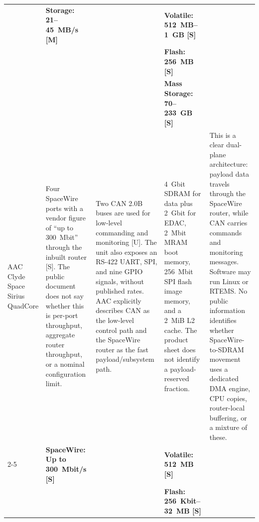 \documentclass[10pt]{../datasheet}
\let\cite\citep
\begin{document}
\begin{landscape}
\begin{longtable}{|p{3.2cm}|p{4.5cm}|p{4.5cm}|p{4.5cm}|p{5.5cm}|}
                                                                       & \textbf{Storage: 21--45~MB/s [M]}
                                                                       &
                                                                       & \textbf{Volatile: 512~MB--1~GB [S]}                                        &                                                                                                \\
                                                                       &                                                                            &                                                  & \textbf{Flash: 256~MB [S]}                & \\
                                                                       &                                                                            &                                                  & \textbf{Mass Storage: 70--233~GB [S]}     & \\ \hline\hline

    AAC Clyde Space Sirius QuadCore \cite{aac_sirius_quadcore_ds}      &
    Four SpaceWire ports with a vendor figure of ``up to 300~Mbit'' through the
    inbuilt router [S]. The public document does not say whether this is
    per-port throughput, aggregate router throughput, or a nominal configuration
    limit.                                                             &
    Two CAN 2.0B buses are used for low-level commanding and monitoring [U]. The
    unit also exposes an RS-422 UART, SPI, and nine GPIO signals, without
    published rates. AAC explicitly describes CAN as the low-level control path
    and the SpaceWire router as the fast payload/subsystem path.       & 4~Gbit SDRAM
    for data plus 2~Gbit for EDAC, 2~Mbit MRAM boot memory, 256~Mbit SPI flash
    image memory, and a 2~MiB L2 cache. The product sheet does not identify a
    payload-reserved fraction.                                         & This is a clear
    dual-plane architecture: payload data travels through the SpaceWire router,
    while CAN carries commands and monitoring messages. Software may run Linux
    or RTEMS. No public information identifies whether SpaceWire-to-SDRAM
    movement uses a dedicated DMA engine, CPU copies, router-local buffering, or
    a mixture of these.
    \\
    \cline{2-5}
                                                                       & \textbf{SpaceWire: Up to 300~Mbit/s [S]}
                                                                       &
                                                                       & \textbf{Volatile: 512~MB [S]}                                              &                                                                                                \\
                                                                       &                                                                            &                                                  & \textbf{Flash: 256~Kbit--32~MB [S]}       & \\ \hline\hline


\end{longtable}
\end{landscape}
\end{document}
